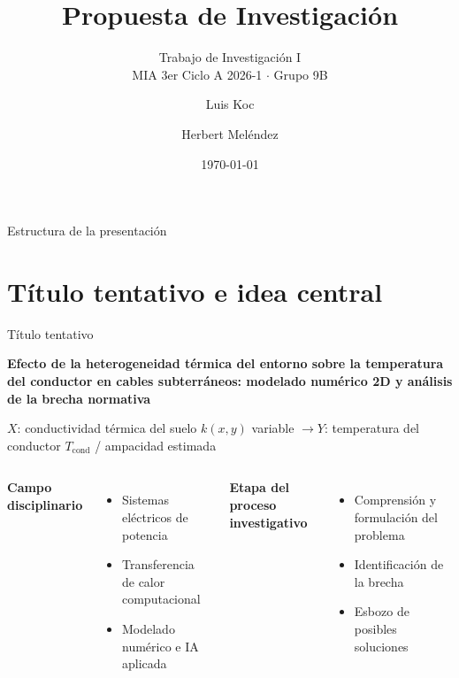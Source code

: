 \documentclass[aspectratio=169]{beamer}
\title{Propuesta de Investigación}
\subtitle{Trabajo de Investigación I\\MIA 3er Ciclo A 2026-1 $\cdot$ Grupo 9B}
\author{Luis Koc \and Herbert Meléndez}
\date{\today}
\begin{document}
\begin{frame}
  \titlepage
\end{frame}

\begin{frame}{Estructura de la presentación}
\tableofcontents[hideallsubsections]
\end{frame}

\section{Título tentativo e idea central}

\begin{frame}{Título tentativo}

\begin{block}{}
\centering\large
\textbf{Efecto de la heterogeneidad térmica del entorno sobre la temperatura
del conductor en cables subterráneos: modelado numérico 2D y análisis de la
brecha normativa}
\par\vspace{0.35em}
\scriptsize\textcolor{gray!80!black}{$X$: conductividad térmica del suelo
$k(x,y)$ variable \quad$\longrightarrow$\quad $Y$: temperatura del conductor
$T_{\text{cond}}$ / ampacidad estimada}
\end{block}

\vspace{0.8em}
\begin{columns}[T]
\textbf{Campo disciplinario}
\begin{itemize}[leftmargin=*]\small
    \item Sistemas eléctricos de potencia
    \item Transferencia de calor computacional
    \item Modelado numérico e IA aplicada
\end{itemize}
\textbf{Etapa del proceso investigativo}
\begin{itemize}[leftmargin=*]\small
    \item Comprensión y formulación del problema
    \item Identificación de la brecha
    \item Esbozo de posibles soluciones
\end{itemize}
\end{columns}
\end{frame}
\end{document}
